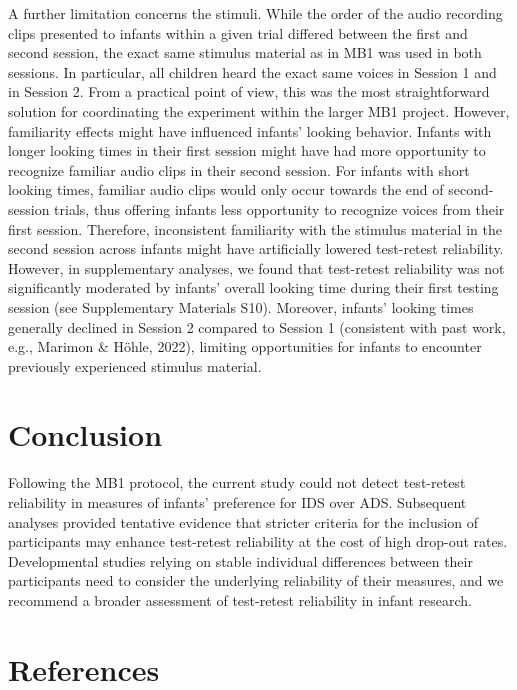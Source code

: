 \documentclass[
  man,floatsintext]{apa6}
\begin{document}
A further limitation concerns the stimuli.
While the order of the audio recording clips presented to infants within a given trial differed between the first and second session, the exact same stimulus material as in MB1 was used in both sessions.
In particular, all children heard the exact same voices in Session 1 and in Session 2.
From a practical point of view, this was the most straightforward solution for coordinating the experiment within the larger MB1 project.
However, familiarity effects might have influenced infants' looking behavior.
Infants with longer looking times in their first session might have had more opportunity to recognize familiar audio clips in their second session.
For infants with short looking times, familiar audio clips would only occur towards the end of second-session trials, thus offering infants less opportunity to recognize voices from their first session.
Therefore, inconsistent familiarity with the stimulus material in the second session across infants might have artificially lowered test-retest reliability.
However, in supplementary analyses, we found that test-retest reliability was not significantly moderated by infants' overall looking time during their first testing session (see Supplementary Materials S10).
Moreover, infants' looking times generally declined in Session 2 compared to Session 1 (consistent with past work, e.g., Marimon \& Höhle, 2022), limiting opportunities for infants to encounter previously experienced stimulus material.

\hypertarget{conclusion}{%
\section{Conclusion}\label{conclusion}}

Following the MB1 protocol, the current study could not detect test-retest reliability in measures of infants' preference for IDS over ADS.
Subsequent analyses provided tentative evidence that stricter criteria for the inclusion of participants may enhance test-retest reliability at the cost of high drop-out rates.
Developmental studies relying on stable individual differences between their participants need to consider the underlying reliability of their measures, and we recommend a broader assessment of test-retest reliability in infant research.

\newpage

\hypertarget{references}{%
\section{References}\label{references}}
\end{document}
